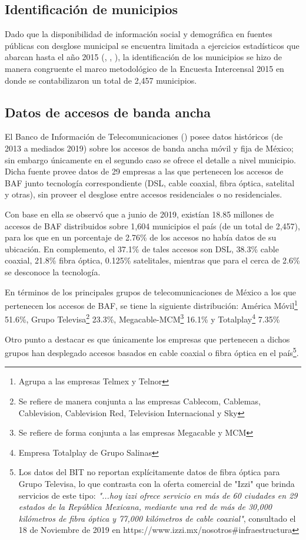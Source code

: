 \documentclass[9pt,twocolumn,twoside]{ilcss}
\begin{document}
\subsection{Identificación de municipios}

Dado que la disponibilidad de información social y demográfica en fuentes públicas con desglose municipal se encuentra limitada a ejercicios estadísticos que abarcan hasta el año 2015 (\cite{Intercensal2015}, \cite{CONAPO2015}, \cite{ONU2015}), la identificación de los municipios se hizo de manera congruente el marco metodológico de la Encuesta Intercensal 2015 en donde se contabilizaron un total de 2,457 municipios.

\subsection{Datos de accesos de banda ancha}

El Banco de Información de Telecomunicaciones (\cite{IFT2019BIT}) posee datos históricos (de 2013 a mediados 2019) sobre los accesos de banda ancha móvil y fija de México; sin embargo únicamente en el segundo caso se ofrece el detalle a nivel municipio. Dicha fuente provee datos de 29 empresas a las que pertenecen los accesos de BAF junto tecnología correspondiente (DSL, cable coaxial, fibra óptica, satelital y otras), sin proveer el desglose entre accesos residenciales o no residenciales. 

Con base en ella se observó que a junio de 2019, existían 18.85 millones de accesos de BAF distribuidos sobre 1,604 municipios el país (de un total de 2,457), para los que en un porcentaje de 2.76\% de los accesos no había datos de su ubicación. En complemento, el 37.1\% de tales accesos son DSL, 38.3\% cable coaxial, 21.8\% fibra óptica, 0.125\% satelitales, mientras que para el cerca de 2.6\% se desconoce la tecnología.

En términos de los principales grupos de telecomunicaciones de México a los que pertenecen los accesos de BAF, se tiene la siguiente distribución: América Móvil\footnote{Agrupa a las empresas Telmex y Telnor}  51.6\%, Grupo Televisa\footnote{Se refiere de manera conjunta a las empresas Cablecom, Cablemas, Cablevision, Cablevision Red, Television Internacional y Sky} 23.3\%, Megacable-MCM\footnote{Se refiere de forma conjunta a las empresas Megacable y MCM}  16.1\% y Totalplay\footnote{Empresa Totalplay de Grupo Salinas} 7.35\%  

Otro punto a destacar es que únicamente los empresas que pertenecen a dichos grupos han desplegado accesos basados en cable coaxial o fibra óptica en el país\footnote{Los datos del BIT no reportan explícitamente datos de fibra óptica para Grupo Televisa, lo que contrasta con la oferta comercial de "Izzi" que brinda servicios de este tipo: \emph{"...hoy izzi ofrece servicio en más de 60 ciudades en 29 estados de la República Mexicana, mediante una red de más de 30,000 kilómetros de fibra óptica y 77,000 kilómetros de cable coaxial"}, consultado el 18 de Noviembre de 2019 en https://www.izzi.mx/nosotros\#infraestructura}.
\end{document}
